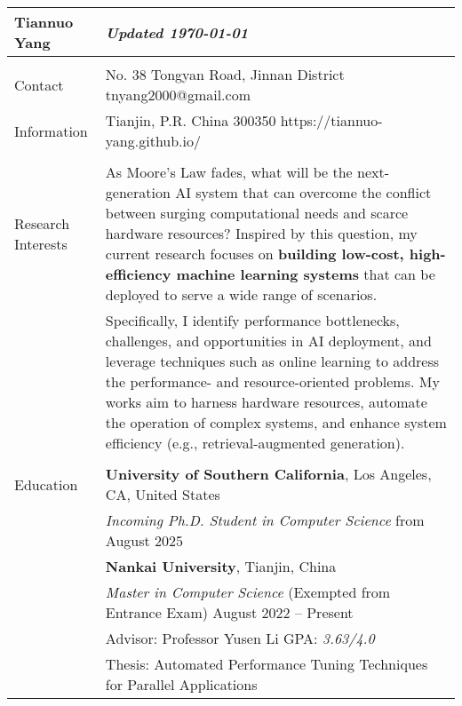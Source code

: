 \documentclass[letterpaper, 10pt]{article}
\begin{document}
\begin{longtable}{p{}p{}}

\textbf{Tiannuo Yang} & \hfill{\it\footnotesize Updated \today} \\
\hline \\



\textcolor{OliveGreen}{Contact} & No. 38 Tongyan Road, Jinnan District \hfill tnyang2000@gmail.com \\
\textcolor{OliveGreen}{Information} & Tianjin, P.R. China 300350 \hfill  https://tiannuo-yang.github.io/ \\
& \\



\nohyphens{\textcolor{OliveGreen}{Research Interests}}
& As Moore’s Law fades, what will be the next-generation AI system that can overcome the conflict between surging computational needs and scarce hardware resources? Inspired by this question, my current research focuses on \textbf{building low-cost, high-efficiency machine learning systems} that can be deployed to serve a wide range of scenarios.
\vspace{0.01\textwidth} \\
& Specifically, I identify performance bottlenecks, challenges, and opportunities in AI deployment, and leverage techniques such as online learning to address the performance- and resource-oriented problems. My works aim to harness hardware resources, automate the operation of complex systems, and enhance system efficiency (e.g., retrieval-augmented generation). \\
& \\



\textcolor{OliveGreen}{Education} 
& \textbf{University of Southern California}, Los Angeles, CA, United States \\
& \textcolor[RGB]{200, 0, 0}{\textit{Incoming Ph.D. Student in Computer Science}} \hfill from August 2025 \vspace{0.01\textwidth} \\

& \textbf{Nankai University}, Tianjin, China \\ 
& \textit{Master in Computer Science} (Exempted from Entrance Exam) \hfill August 2022 -- Present \\
& Advisor: Professor Yusen Li \hspace{0.04\textwidth} GPA: \textit{3.63/4.0} \\
& Thesis: Automated Performance Tuning Techniques for Parallel Applications \vspace{0.01\textwidth} \\


\end{longtable}
\end{document}
